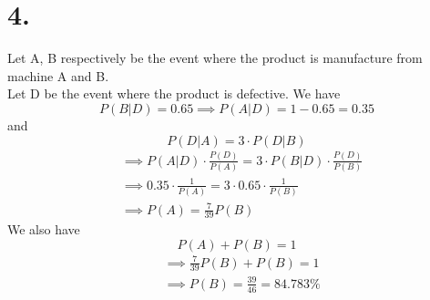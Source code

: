\documentclass[11pt]{article}
\begin{document}
\section*{4.}
Let A, B respectively be the event where the product is manufacture from machine A and B. \\
Let D be the event where the product is defective. 
We have
\[P(B|D) = 0.65 \implies P(A|D) = 1-0.65 = 0.35\]
and
\[P(D|A) = 3 \cdot P(D|B)\]
\begin{equation*}
\begin{aligned}
&\implies P(A|D) \cdot \frac{P(D)}{P(A)}= 3 \cdot P(B|D) \cdot \frac{P(D)}{P(B)} \\
&\implies 0.35 \cdot \frac{1}{P(A)} = 3 \cdot 0.65 \cdot \frac{1}{P(B)} \\
&\implies P(A) = \frac{7}{39} P(B)
\end{aligned}
\end{equation*}
We also have 
\[P(A) + P(B) = 1\]
\begin{equation*}
\begin{aligned}
& \implies  \frac{7}{39} P(B) + P(B) = 1 \\
& \implies P(B) = \frac{39}{46} = 84.783\%
\end{aligned}
\end{equation*}



\pagebreak
\end{document}
